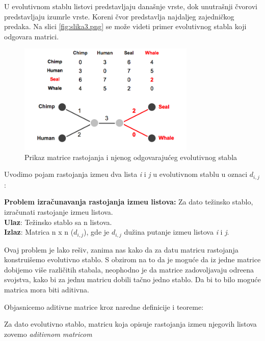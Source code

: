 U evolutivnom stablu listovi predstavljaju dana\v{s}nje vrste, dok unutra\v{s}nji \v{c}vorovi predstavljaju izumrle vrste. Koreni \v{c}vor predstavlja najdaljeg zajedni\v{c}kog predaka. Na slici \ref{fig:slika3.png} se mo\v{z}e videti primer evolutivnog stabla koji odgovara matrici.

\begin{figure}[h]
\centering
\includegraphics[width=0.75\textwidth]{poglavlja/7/slike/slika3.png}
\caption{Prikaz matrice rastojanja i njenog odgovaraju\'ceg evolutivnog stabla}
\end{figure} 

Uvodimo pojam rastojanja izme\dj u dva lista \textit{i} i \textit{j} u evolutivnom stablu u oznaci $d_{i, j}$:
\begin{tcolorbox}
\textbf{Problem izra\v{c}unavanja rastojanja izme\dj u listova:} Za dato te\v{z}insko stablo, izra\v{c}unati rastojanje izme\dj u listova.\\
\textbf{Ulaz}: Te\v{z}insko stablo sa n listova.\\
\textbf{Izlaz}: Matrica n x n ($d_{i, j}$), gde je $d_{i, j}$ du\v{z}ina putanje izme\dj u listova \textit{i} i \textit{j}.
\end{tcolorbox}

Ovaj problem je lako re\v{s}iv, zanima nas kako da za datu matricu rastojanja konstrui\v{s}emo evolutivno stablo. S obzirom na to da je mogu\'ce da iz jedne matrice dobijemo vi\v{s}e razli\v{c}itih stabala, neophodno je da matrice zadovoljavaju odre\dj ena svojstva, kako bi za jednu matricu dobili ta\v{c}no jedno stablo. Da bi to bilo mogu\'ce matrica mora biti aditivna.

Objasnicemo aditivne matrice kroz naredne definicije i teoreme:

\begin{definicija}
Za dato evolutivno stablo, matricu koja opisuje rastojanja izme\dj u njegovih listova zovemo \textit{aditivnom matricom}
\end{definicija}

